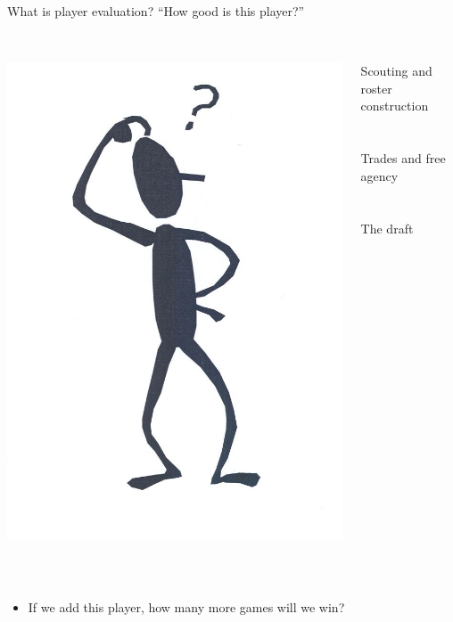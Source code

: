 \documentclass{beamer}
\begin{document}
\begin{frame}{What is player evaluation?}
  ``How good is this player?''\\
  ~\\
  \begin{columns}
    \begin{column}{0.3\textwidth}
      \centering
      \includegraphics[width = \textwidth]{images/stickman_thinking.jpg}
    \end{column}
    \begin{column}{0.7\textwidth}
      Scouting and roster construction\\
      ~\\
      ~\\
      Trades and free agency\\
      ~\\
      ~\\
      The draft
    \end{column}
  \end{columns}
  ~\\
  \begin{itemize}
    \item If we add this player, how many more games will we win?
  \end{itemize}
\end{frame}
\end{document}
